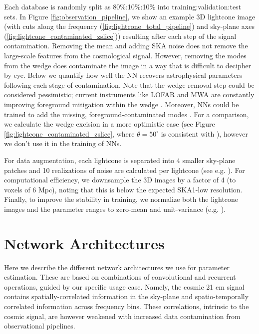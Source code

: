 \documentclass[fleqn,usenatbib]{mnras}
\begin{document}
Each database is randomly split as 80\%:10\%:10\% into training:validation:test sets.  In Figure \ref{fig:observation_pipeline}, we show an example 3D lightcone image (with cuts along the frequency (\ref{fig:lightcone_total_pipeline}) and sky-plane axes (\ref{fig:lightcone_contaminated_zslice})) resulting after each step of the signal contamination.  Removing the mean and adding SKA noise does not remove the large-scale features from the cosmological signal.  However, removing the modes from the wedge does contaminate the image in a way that is difficult to decipher by eye.  Below we quantify how well the NN recovers astrophysical parameters following each stage of contamination. Note that the wedge removal step could be considered pessimistic; current instruments like LOFAR and MWA are constantly improving foreground mitigation within the wedge \citep{li2018comparing,barry2019,LOFAR2020,hothi2021}. Moreover, NNs could be trained to add the missing, foreground-contaminated modes \citep{Gargon-Hartman21}. 
For a comparison, we calculate the wedge excision in a more optimistic case (see Figure \ref{fig:lightcone_contaminated_zslice}, where $\theta = 50^{\circ}$ is consistent with \citealt{LOFAR2020}), however we don't use it in the training of NNs.

For data augmentation, each lightcone is separated into $4$ smaller sky-plane patches and 10 realizations of noise are calculated per lightcone (see e.g. \citealt{perez2017effectiveness, shorten2019survey}). 
For computational efficiency, we downsample the 3D images by a factor of 4 (to voxels of 6 Mpc), noting that this is below the expected SKA1-low resolution.
Finally, to improve the stability in training, we normalize both the lightcone images and the parameter ranges to zero-mean and unit-variance (e.g. \citealt{lecun2012efficient}).

\section{Network Architectures} \label{ch:network_architectures}

Here we describe the different network architectures we use for parameter estimation.  These are based on combinations of convolutional and recurrent operations, guided by our specific usage case.  Namely, the cosmic 21 cm signal contains
spatially-correlated information in the sky-plane and spatio-temporally correlated information across frequency bins. These correlations, intrinsic to the cosmic signal, are however weakened with increased data contamination from observational pipelines. 
\end{document}
